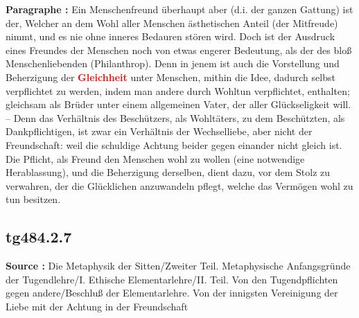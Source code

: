 \documentclass[a4paper,12pt,twoside]{book}
\newcommand{\match}[1]{\textcolor{red}{\textbf{#1}}}
\begin{document}
	\textbf{Paragraphe : }Ein Menschenfreund überhaupt aber (d.i. der ganzen Gattung) ist der, Welcher an dem Wohl aller Menschen ästhetischen Anteil (der Mitfreude) nimmt, und es nie ohne inneres Bedauren stören wird. Doch ist der Ausdruck eines Freundes der Menschen noch von etwas engerer Bedeutung, als der des bloß Menschenliebenden (Philanthrop). Denn in jenem ist auch die Vorstellung und Beherzigung der \match{Gleichheit} unter Menschen, mithin die Idee, dadurch  selbst verpflichtet zu werden, indem man andere durch Wohltun verpflichtet, enthalten; gleichsam als Brüder unter einem allgemeinen Vater, der aller Glückseligkeit will. – Denn das Verhältnis des Beschützers, als Wohltäters, zu dem Beschützten, als Dankpflichtigen, ist zwar ein Verhältnis der Wechselliebe, aber nicht der Freundschaft: weil die schuldige Achtung beider gegen einander nicht gleich ist. Die Pflicht, als Freund den Menschen wohl zu wollen (eine notwendige Herablassung), und die Beherzigung derselben, dient dazu, vor dem Stolz zu verwahren, der die Glücklichen anzuwandeln pflegt, welche das Vermögen wohl zu tun besitzen. 
	
	\subsection*{tg484.2.7} 
	\textbf{Source : }Die Metaphysik der Sitten/Zweiter Teil. Metaphysische Anfangsgründe der Tugendlehre/I. Ethische Elementarlehre/II. Teil. Von den Tugendpflichten gegen andere/Beschluß der Elementarlehre. Von der innigsten Vereinigung der Liebe mit der Achtung in der Freundschaft\\  
	
\end{document}

